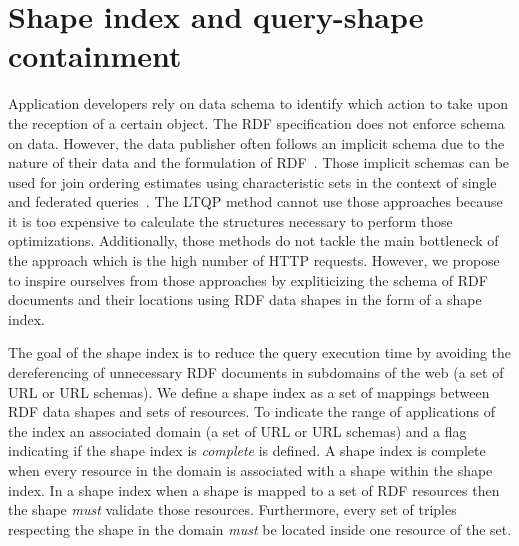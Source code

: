 \section{Shape index and query-shape containment}



Application developers rely on data schema to identify which action to take upon the reception of a certain object.
The RDF specification does not enforce schema on data.
However, the data publisher often follows an implicit schema due to the nature of their data and the formulation of RDF~\cite{Neumann2011CharacteristicSA}.
Those implicit schemas can be used  for join ordering estimates using characteristic sets in the context of single and federated queries~\cite{Neumann2011CharacteristicSA, Meimaris2017ExtendedCS, Meimaris2018HierarchicalCS}.
The LTQP method cannot use those approaches because it is too expensive to calculate the structures necessary to perform those optimizations.
Additionally, those methods do not tackle the main bottleneck of the approach which is the high number of HTTP requests.
However, we propose to inspire ourselves from those approaches by expliticizing the schema of RDF documents and their locations using RDF data shapes in the form of a shape index.

The goal of the shape index is to reduce the query execution time by avoiding the dereferencing of unnecessary RDF documents in subdomains of the web (a set of URL or URL schemas).
We define a shape index as a set of mappings between RDF data shapes and sets of resources.
To indicate the range of applications of the index an associated domain (a set of URL or URL schemas) and a flag indicating if the shape index is \emph{complete} is defined.
A shape index is complete when every resource in the domain is associated with a shape within the shape index.
In a shape index when a shape is mapped to a set of RDF resources then the shape \emph{must} validate those resources.
Furthermore, every set of triples respecting the shape in the domain \emph{must} be located inside one resource of the set.

